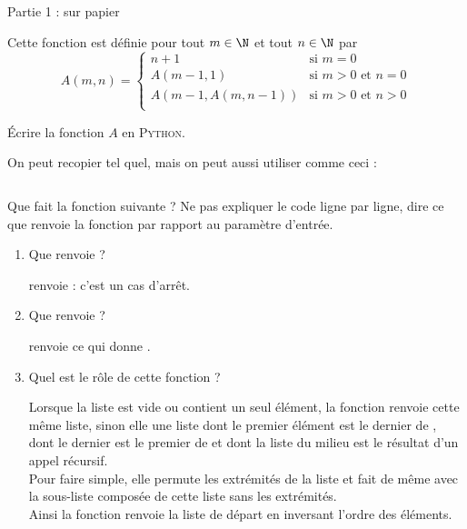 \documentclass[a4paper,10pt]{article}
\begin{document}

{\color{UGLiBlue}\Huge\titlefont Partie 1 : sur papier\\}


Cette fonction est définie pour tout $m\in\N$ et tout $n\in\N$ par
 $$A(m,n)=\begin{cases}
	n+1 & \mbox{si } m=0\\
	A(m-1,1) &\mbox{si } m>0\mbox{ et } n=0\\
	A(m-1,A(m,n-1)) &\mbox{si } m>0\mbox{ et } n>0\\
\end{cases}$$

\'Ecrire la fonction $A$ en \textsc{Python}.\\

\begin{encadre}[Réponse]
On peut recopier tel quel, mais on peut aussi utiliser  comme ceci :
\inputminted{python}{scripts/ackermann.py}
\end{encadre}



Que fait la fonction suivante ? Ne pas expliquer le code ligne par ligne, dire ce que renvoie la fonction par rapport au paramètre d'entrée.
\begin{enumerate}[\bfseries 1.]
	\item 	Que renvoie  ?\\
    \begin{encadre}[Réponse]
     renvoie \pythoninline{[1]} : c'est un cas d'arrêt.
    \end{encadre}
	\item 	Que renvoie  ?\\
    \begin{encadre}[Réponse]
     renvoie  ce qui donne \pythoninline{[3, 2, 1]}.
    \end{encadre}
    \item   Quel est le rôle de cette fonction ?\\

\begin{encadre}[Réponse]
Lorsque la liste est vide ou contient un seul élément, la fonction renvoie cette même liste, sinon elle une liste dont le premier élément est le dernier de , dont le dernier est le premier de  et dont la liste du \og milieu\fg{} est le résultat d'un appel récursif.\\
Pour faire simple, elle permute les extrémités de la liste et fait de même avec la sous-liste composée de cette liste sans les extrémités.\\
Ainsi la fonction renvoie la liste de départ en inversant l'ordre des éléments.
\end{encadre}
\end{enumerate}
\exo{}\\
\end{document}
